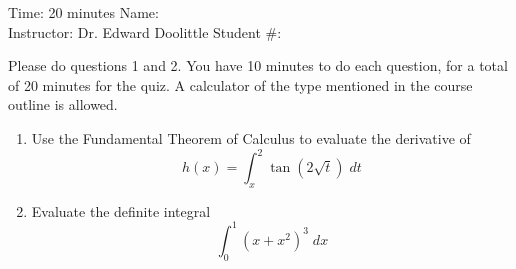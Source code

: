 \documentclass[12pt]{article}
\begin{document}
\thispagestyle{plain}

\begin{flushleft}
Time:  20 minutes                \hfill       Name: \underline{\hspace{2in}} \\
Instructor: Dr. Edward Doolittle \hfill Student \#: \underline{\hspace{2in}}
\end{flushleft}

\noindent
Please do questions 1 and 2.  You have 10 minutes
to do each question, for a total of 20
minutes for the quiz.  A 
calculator of the type mentioned in the course outline is allowed.

\begin{enumerate}
\item Use 
  the Fundamental Theorem of Calculus to evaluate the derivative of
  \begin{equation*}
    h(x) = \int_{x}^2 \tan(2\sqrt{t}) \; dt
  \end{equation*}
\vfill
\newpage
\item Evaluate 
  the definite integral 
  \begin{equation*}
    \int_0^1 (x+x^2)^3 \; dx
  \end{equation*}
\vfill
\end{enumerate}
\end{document}
